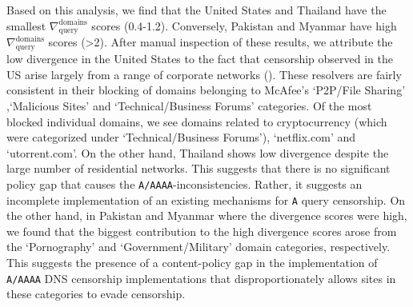 Based on this analysis, we find that the United States and Thailand have the
smallest $\nabla_{\text{query}}^{\text{domains}}$ scores (0.4-1.2). Conversely,
Pakistan and Myanmar have high $\nabla_{\text{query}}^{\text{domains}}$
scores (>2). 
%
After manual inspection of these results, we attribute the low divergence in
the United States to the fact that censorship observed in the US arise largely
from a range of corporate networks (). These resolvers are fairly
consistent in their blocking of domains belonging to McAfee's `P2P/File Sharing' 
,`Malicious Sites' and `Technical/Business Forums' categories. Of the most blocked
individual domains, we see domains related to cryptocurrency (which were categorized
under `Technical/Business Forums'), `netflix.com' and `utorrent.com'. 
%
On the other hand, Thailand shows low divergence despite the large
number of residential networks. This suggests that there is no significant
policy gap that causes the {\tt A/AAAA}-inconsistencies. Rather, it suggests
an incomplete implementation of an existing mechanisms for {\tt A} query
censorship. 
%
On the other hand, in Pakistan and Myanmar where the divergence scores were
high, we found that the biggest contribution to the high divergence scores
arose from the `Pornography' and `Government/Military' domain categories,
respectively. This suggests the presence of a content-policy gap in the
implementation of {\tt A/AAAA} DNS censorship implementations that
disproportionately allows sites in these categories to evade censorship.


